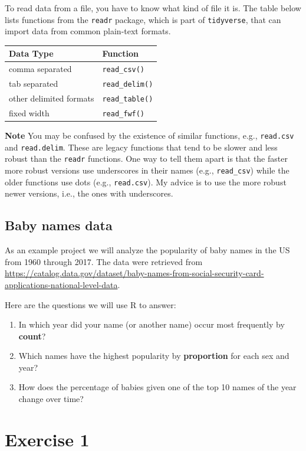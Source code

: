 \documentclass[]{book}
\providecommand{\tightlist}{%
  \setlength{\itemsep}{0pt}\setlength{\parskip}{0pt}}
\begin{document}
To read data from a file, you have to know what kind of file
it is. The table below lists functions from the \texttt{readr} package, which
is part of \texttt{tidyverse}, that can import data from common plain-text formats.

\begin{longtable}[]{@{}ll@{}}
\toprule
Data Type & Function\tabularnewline
\midrule
\endhead
comma separated & \texttt{read\_csv()}\tabularnewline
tab separated & \texttt{read\_delim()}\tabularnewline
other delimited formats & \texttt{read\_table()}\tabularnewline
fixed width & \texttt{read\_fwf()}\tabularnewline
\bottomrule
\end{longtable}

\textbf{Note} You may be confused by the existence of similar functions,
e.g., \texttt{read.csv} and \texttt{read.delim}. These are legacy functions that
tend to be slower and less robust than the \texttt{readr} functions. One way
to tell them apart is that the faster more robust versions use
underscores in their names (e.g., \texttt{read\_csv}) while the older
functions use dots (e.g., \texttt{read.csv}). My advice is to use the more
robust newer versions, i.e., the ones with underscores.

\hypertarget{baby-names-data}{%
\subsection{Baby names data}\label{baby-names-data}}

As an example project we will analyze the popularity of baby names in the US from 1960 through 2017. The data were retrieved from
\url{https://catalog.data.gov/dataset/baby-names-from-social-security-card-applications-national-level-data}.

Here are the questions we will use R to answer:

\begin{enumerate}
\def\labelenumi{\arabic{enumi}.}
\tightlist
\item
  In which year did your name (or another name) occur most frequently by \textbf{count}?
\item
  Which names have the highest popularity by \textbf{proportion} for each sex and year?
\item
  How does the percentage of babies given one of the top 10 names of the year change over time?
\end{enumerate}

\hypertarget{exercise-1}{%
\section{Exercise 1}\label{exercise-1}}
\end{document}

